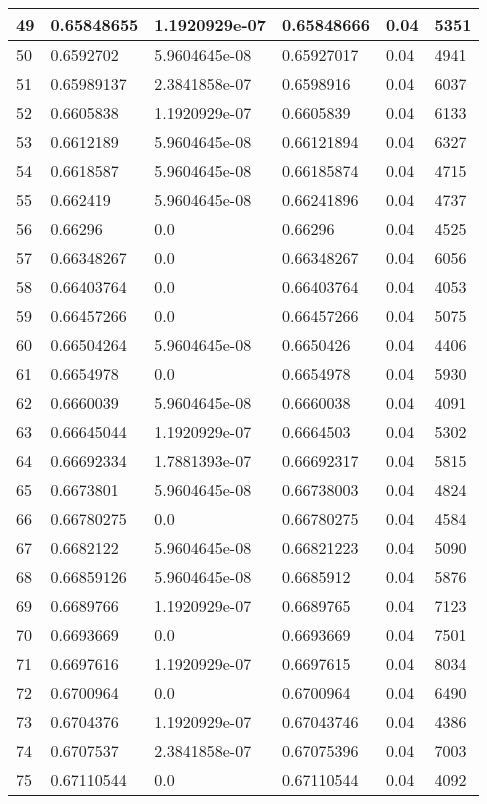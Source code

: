 \begin{longtable}{|l|l|l|l|l|l|}
49 & 0.65848655 & 1.1920929e-07 & 0.65848666 & 0.04 & 5351 \\ \hline 
50 & 0.6592702 & 5.9604645e-08 & 0.65927017 & 0.04 & 4941 \\ \hline 
51 & 0.65989137 & 2.3841858e-07 & 0.6598916 & 0.04 & 6037 \\ \hline 
52 & 0.6605838 & 1.1920929e-07 & 0.6605839 & 0.04 & 6133 \\ \hline 
53 & 0.6612189 & 5.9604645e-08 & 0.66121894 & 0.04 & 6327 \\ \hline 
54 & 0.6618587 & 5.9604645e-08 & 0.66185874 & 0.04 & 4715 \\ \hline 
55 & 0.662419 & 5.9604645e-08 & 0.66241896 & 0.04 & 4737 \\ \hline 
56 & 0.66296 & 0.0 & 0.66296 & 0.04 & 4525 \\ \hline 
57 & 0.66348267 & 0.0 & 0.66348267 & 0.04 & 6056 \\ \hline 
58 & 0.66403764 & 0.0 & 0.66403764 & 0.04 & 4053 \\ \hline 
59 & 0.66457266 & 0.0 & 0.66457266 & 0.04 & 5075 \\ \hline 
60 & 0.66504264 & 5.9604645e-08 & 0.6650426 & 0.04 & 4406 \\ \hline 
61 & 0.6654978 & 0.0 & 0.6654978 & 0.04 & 5930 \\ \hline 
62 & 0.6660039 & 5.9604645e-08 & 0.6660038 & 0.04 & 4091 \\ \hline 
63 & 0.66645044 & 1.1920929e-07 & 0.6664503 & 0.04 & 5302 \\ \hline 
64 & 0.66692334 & 1.7881393e-07 & 0.66692317 & 0.04 & 5815 \\ \hline 
65 & 0.6673801 & 5.9604645e-08 & 0.66738003 & 0.04 & 4824 \\ \hline 
66 & 0.66780275 & 0.0 & 0.66780275 & 0.04 & 4584 \\ \hline 
67 & 0.6682122 & 5.9604645e-08 & 0.66821223 & 0.04 & 5090 \\ \hline 
68 & 0.66859126 & 5.9604645e-08 & 0.6685912 & 0.04 & 5876 \\ \hline 
69 & 0.6689766 & 1.1920929e-07 & 0.6689765 & 0.04 & 7123 \\ \hline 
70 & 0.6693669 & 0.0 & 0.6693669 & 0.04 & 7501 \\ \hline 
71 & 0.6697616 & 1.1920929e-07 & 0.6697615 & 0.04 & 8034 \\ \hline 
72 & 0.6700964 & 0.0 & 0.6700964 & 0.04 & 6490 \\ \hline 
73 & 0.6704376 & 1.1920929e-07 & 0.67043746 & 0.04 & 4386 \\ \hline 
74 & 0.6707537 & 2.3841858e-07 & 0.67075396 & 0.04 & 7003 \\ \hline 
75 & 0.67110544 & 0.0 & 0.67110544 & 0.04 & 4092 \\ \hline 
\end{longtable}